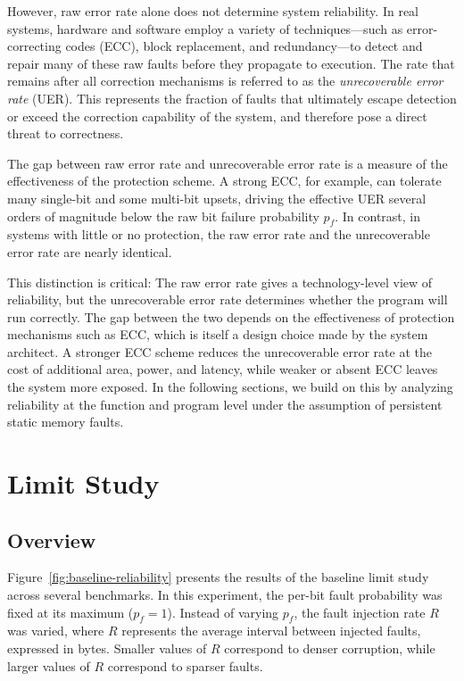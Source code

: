 However, raw error rate alone does not determine system reliability. In real systems, 
hardware and software employ a variety of techniques---such as error-correcting codes 
(ECC), block replacement, and redundancy---to detect and repair many of these raw 
faults before they propagate to execution. The rate that remains after all correction 
mechanisms is referred to as the \emph{unrecoverable error rate} (UER). This represents 
the fraction of faults that ultimately escape detection or exceed the correction 
capability of the system, and therefore pose a direct threat to correctness.

The gap between raw error rate and unrecoverable error rate is a measure of the 
effectiveness of the protection scheme. A strong ECC, for example, can tolerate many 
single-bit and some multi-bit upsets, driving the effective UER several orders of 
magnitude below the raw bit failure probability $p_f$. In contrast, in systems with 
little or no protection, the raw error rate and the unrecoverable error rate are nearly 
identical. 

This distinction is critical: The raw error rate gives a technology-level view of reliability, 
but the unrecoverable error rate determines whether the program will run correctly. 
The gap between the two depends on the effectiveness of protection mechanisms such as ECC, 
which is itself a design choice made by the system architect. A stronger ECC scheme 
reduces the unrecoverable error rate at the cost of additional area, power, and latency, 
while weaker or absent ECC leaves the system more exposed. In the following sections, 
we build on this by analyzing reliability at the function and program level under the 
assumption of persistent static memory faults.

\section{Limit Study}
\label{sec:ch2-limit-study}

\subsection{Overview}
\label{subsec:limit-overview}

Figure~\ref{fig:baseline-reliability} presents the results of the baseline limit study across several benchmarks. 
In this experiment, the per-bit fault probability was fixed at its maximum ($p_f = 1$). 
Instead of varying $p_f$, the fault injection rate $R$ was varied, where $R$ represents 
the average interval between injected faults, expressed in bytes. 
Smaller values of $R$ correspond to denser corruption, while larger values of $R$ correspond to sparser faults.  

